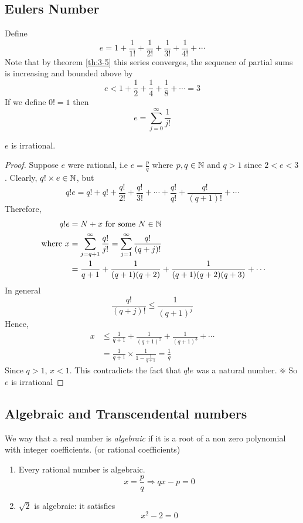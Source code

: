 \documentclass{article}
\begin{document}

\subsection{Eulers Number}
Define
\[
    e = 1 + \frac{1}{1!} + \frac{1}{2!} + \frac{1}{3!} + \frac{1}{4!} + \cdots  
\]
Note that by theorem \ref{th:3-5} this series converges, the sequence of partial sums is increasing and bounded above by
\[
    e < 1 + \frac{1}{2} + \frac{1}{4} + \frac{1}{8} + \cdots = 3
\]
If we define $0! = 1$ then
\[
    e = \sum_{j=0}^\infty \frac{1}{j!}
\]

\begin{nprop}\label{prop:3-8}
    $e$ is irrational.
\end{nprop}
\begin{proof}
    Suppose $e$ were rational, i.e $e = \frac{p}{q}$ where $p, q \in \mathbb{N}$ and $q > 1$ since $2 < e < 3$.
    Clearly, $q! \times e \in \mathbb{N}$, but 
    \[
        q! e = q! + q! + \frac{q!}{2!} + \frac{q!}{3!} + \cdots + \frac{q!}{q!} + \frac{q!}{(q+1)!} + \cdots  
    \]
    Therefore,
    \begin{align*}
        q!e &= N + x \text{ for some } N \in \mathbb{N}\\
        \text{ where } x &= \sum_{j=q+1}^{\infty} \frac{q!}{j!} = \sum_{j=1}^\infty \frac{q!}{(q + j)!} \\
        &= \frac{1}{q+1} + \frac{1}{(q+1)(q+2)} + \frac{1}{(q+1)(q+2)(q+3)} + \cdots
    \end{align*}
    In general
    \[
        \frac{q!}{(q + j)!} \leq \frac{1}{(q+1)^j}  
    \]
    Hence,
    \begin{align*}
        x &\leq \frac{1}{q +1} + \frac{1}{(q + 1)^2} + \frac{1}{(q + 1)^3} + \cdots \\
        &= \frac{1}{q + 1} \times \frac{1}{1 - \frac{1}{q + 1}} = \frac{1}{q}
    \end{align*}
    Since $q > 1$, $x < 1$.
    This contradicts the fact that $q!e$ was a natural number. $\contradiction$
    So $e$ is irrational
\end{proof}

\subsection{Algebraic and Transcendental numbers}
\begin{defi}[Algebraic]
    We way that a real number is \emph{algebraic} if it is a root of a non zero polynomial with integer coefficients. (or rational coefficients)
\end{defi}
\begin{eg}\leavevmode
    \begin{enumerate}[label=(\arabic*)]
        \item Every rational number is algebraic. 
        \[
            x = \frac{p}{q} \Rightarrow qx - p = 0  
        \]
        \item $\sqrt{2}$ is algebraic: it satisfies
        \[
            x^2 - 2 = 0
        \]
    \end{enumerate}
\end{eg}
\end{document}
